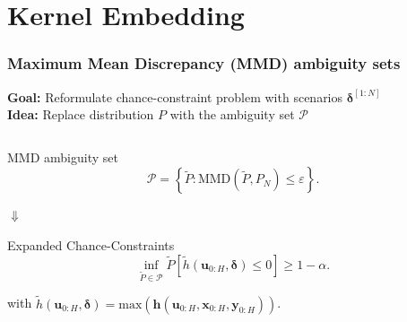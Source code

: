 \documentclass[student, noshadow, itr, english, aspectratio=169]{ITR_LSR_slides}
\begin{document}
\section{Kernel Embedding}

\begin{frame}
	\frametitle{Maximum Mean Discrepancy (MMD) ambiguity sets}
\textbf{Goal:} Reformulate chance-constraint problem with scenarios $\boldsymbol{\delta}^{[1:N]}$\\
\textbf{Idea:} Replace distribution $P$ with the ambiguity set $\mathcal{P}$\\

\begin{columns}[onlytextwidth, T]
\begin{column}{.65\textwidth}

\begin{block}{MMD ambiguity set}
\begin{equation*}
\mathcal{P} =  \left\{ \tilde{P} : \text{MMD} (\tilde{P}, P_N) \leq \varepsilon \right\}.
\end{equation*}
\end{block}	

\makebox[4.2cm]{\hfill} $\boldsymbol{\Downarrow}$ 

\begin{block}{Expanded Chance-Constraints}
\begin{equation*}
\inf\limits_{\tilde{P} \in \mathcal{P}}\tilde{P} \left[ \tilde{h}(\boldsymbol{u}_{0:H},  \boldsymbol{\delta}) \leq 0 \right] \geq 1 - \alpha.
\end{equation*}
\end{block}

with $\tilde{h}(\boldsymbol{u}_{0:H},  \boldsymbol{\delta})  =  \text{max}(\boldsymbol{h}(\boldsymbol{u}_{0:H},  \boldsymbol{x}_{0:H},  \boldsymbol{y}_{0:H}))$.


\end{column}
\end{columns}
\end{frame}
\end{document}
